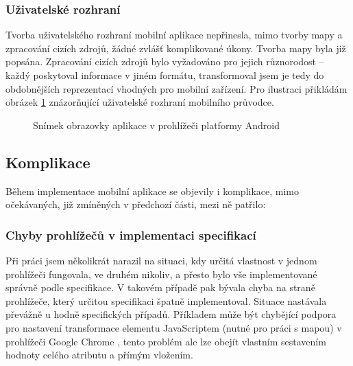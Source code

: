 \subsubsection{Uživatelské rozhraní}
Tvorba uživatelského rozhraní mobilní aplikace nepřinesla, mimo tvorby mapy a zpracování cizích zdrojů, žádné zvlášť komplikované úkony. Tvorba mapy byla již popsána. Zpracování cizích zdrojů bylo vyžadováno pro jejich různorodost -- každý poskytoval informace v jiném formátu, transformoval jsem je tedy do obdobnějších reprezentací vhodných pro mobilní zařízení. Pro ilustraci přikládám obrázek \ref{fig:mobil:android:pruvodce} znázorňující uživatelské rozhraní mobilního průvodce.
\begin{figure}[h]
 \centering
 \setlength\fboxsep{0pt}
 \setlength\fboxrule{0.5pt}
 \caption{Snímek obrazovky aplikace v prohlížeči platformy Android}
 \label{fig:mobil:android:pruvodce}
\end{figure}



\subsection{Komplikace}
Během implementace mobilní aplikace se objevily i komplikace, mimo očekávaných, již zmíněných v předchozí části, mezi ně patřilo:

\subsubsection{Chyby prohlížečů v implementaci specifikací}
Při práci jsem několikrát narazil na situaci, kdy určitá vlastnost v jednom prohlížeči fungovala, ve druhém nikoliv, a přesto bylo vše implementované správně podle specifikace. V takovém případě pak bývala chyba na straně prohlížeče, který určitou specifikaci špatně implementoval. Situace nastávala převážně u hodně specifických případů. Příkladem může být chybějící podpora pro nastavení transformace  elementu JavaScriptem (nutné pro práci s mapou) v prohlížeči Google Chrome \cite{BugChromeTran}, tento problém ale lze obejít vlastním sestavením hodnoty celého atributu a přímým vložením. 

